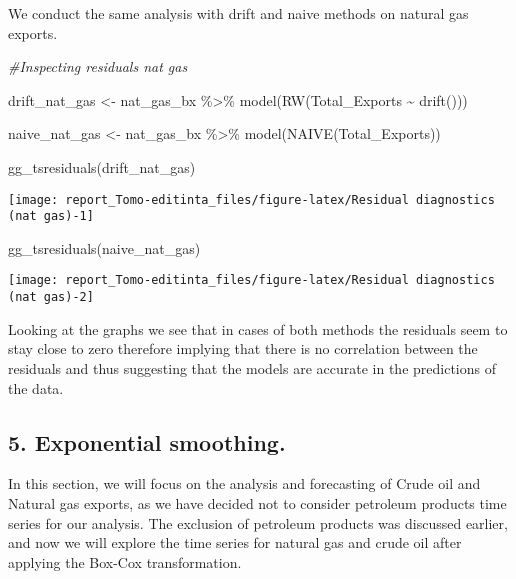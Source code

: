\documentclass[
]{article}
\newenvironment{Shaded}{\begin{snugshade}}{\end{snugshade}}
\newcommand{\CommentTok}[1]{\textcolor[rgb]{0.56,0.35,0.01}{\textit{#1}}}
\newcommand{\FunctionTok}[1]{\textcolor[rgb]{0.00,0.00,0.00}{#1}}
\newcommand{\NormalTok}[1]{#1}
\newcommand{\OtherTok}[1]{\textcolor[rgb]{0.56,0.35,0.01}{#1}}
\newcommand{\SpecialCharTok}[1]{\textcolor[rgb]{0.00,0.00,0.00}{#1}}
\begin{document}
We conduct the same analysis with drift and naive methods on natural gas
exports.

\begin{Shaded}
\begin{Highlighting}[]
\CommentTok{\#Inspecting residuals nat gas}

\NormalTok{drift\_nat\_gas }\OtherTok{\textless{}{-}}\NormalTok{ nat\_gas\_bx }\SpecialCharTok{\%\textgreater{}\%} 
  \FunctionTok{model}\NormalTok{(}\FunctionTok{RW}\NormalTok{(Total\_Exports }\SpecialCharTok{\textasciitilde{}} \FunctionTok{drift}\NormalTok{()))}

\NormalTok{naive\_nat\_gas }\OtherTok{\textless{}{-}}\NormalTok{ nat\_gas\_bx }\SpecialCharTok{\%\textgreater{}\%} 
  \FunctionTok{model}\NormalTok{(}\FunctionTok{NAIVE}\NormalTok{(Total\_Exports))}

\FunctionTok{gg\_tsresiduals}\NormalTok{(drift\_nat\_gas)}
\end{Highlighting}
\end{Shaded}

\begin{center}\texttt{[image: report\_Tomo-editinta\_files/figure-latex/Residual diagnostics (nat gas)-1]} \end{center}

\begin{Shaded}
\begin{Highlighting}[]
\FunctionTok{gg\_tsresiduals}\NormalTok{(naive\_nat\_gas)}
\end{Highlighting}
\end{Shaded}

\begin{center}\texttt{[image: report\_Tomo-editinta\_files/figure-latex/Residual diagnostics (nat gas)-2]} \end{center}

Looking at the graphs we see that in cases of both methods the residuals
seem to stay close to zero therefore implying that there is no
correlation between the residuals and thus suggesting that the models
are accurate in the predictions of the data.

\hypertarget{exponential-smoothing.}{%
\subsection{5. Exponential smoothing.}\label{exponential-smoothing.}}

In this section, we will focus on the analysis and forecasting of Crude
oil and Natural gas exports, as we have decided not to consider
petroleum products time series for our analysis. The exclusion of
petroleum products was discussed earlier, and now we will explore the
time series for natural gas and crude oil after applying the Box-Cox
transformation.
\end{document}
